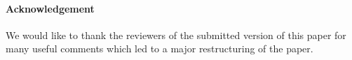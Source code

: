 









\paragraph{Acknowledgement} We would like to thank the reviewers of the submitted version of this paper for many useful comments which led to a major restructuring of the paper.
